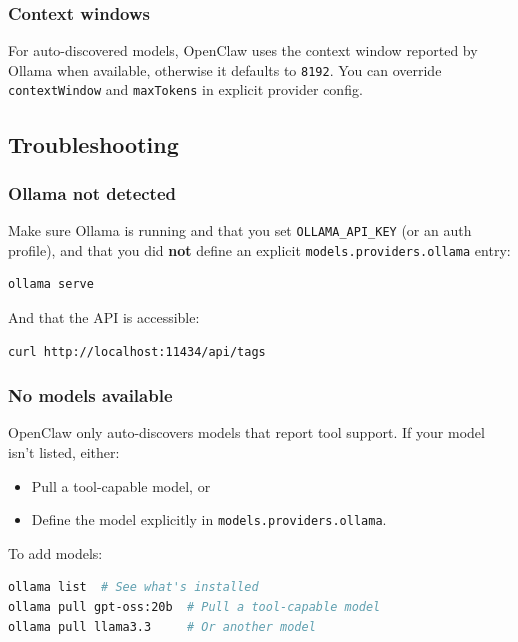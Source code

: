 \subsubsection{Context windows}


For auto-discovered models, OpenClaw uses the context window reported by Ollama when available, otherwise it defaults to \texttt{8192}. You can override \texttt{contextWindow} and \texttt{maxTokens} in explicit provider config.

\subsection{Troubleshooting}


\subsubsection{Ollama not detected}


Make sure Ollama is running and that you set \texttt{OLLAMA\_API\_KEY} (or an auth profile), and that you did \textbf{not} define an explicit \texttt{models.providers.ollama} entry:

\begin{lstlisting}[language=bash]
ollama serve
\end{lstlisting}


And that the API is accessible:

\begin{lstlisting}[language=bash]
curl http://localhost:11434/api/tags
\end{lstlisting}


\subsubsection{No models available}


OpenClaw only auto-discovers models that report tool support. If your model isn't listed, either:

\begin{itemize}
  \item Pull a tool-capable model, or
  \item Define the model explicitly in \texttt{models.providers.ollama}.
\end{itemize}


To add models:

\begin{lstlisting}[language=bash]
ollama list  # See what's installed
ollama pull gpt-oss:20b  # Pull a tool-capable model
ollama pull llama3.3     # Or another model
\end{lstlisting}


